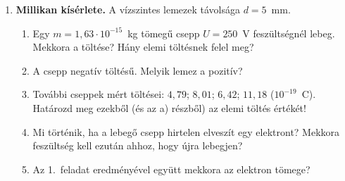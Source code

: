 \documentclass[12pt]{article}
\begin{document}
\vspace{4pt}
\begin{enumerate}[start=2]
\item \textbf{Millikan kísérlete.} A vízszintes lemezek távolsága $d = 5$~mm.
  \begin{enumerate}
    \item Egy $m = 1{,}63\cdot 10^{-15}$~kg tömegű csepp $U = 250$~V feszültségnél lebeg.
      Mekkora a töltése? Hány elemi töltésnek felel meg?
    \item A csepp negatív töltésű. Melyik lemez a pozitív?
    \item További cseppek mért töltései: $4{,}79$; $8{,}01$; $6{,}42$; $11{,}18$
      ($10^{-19}$~C). Határozd meg ezekből (és az a) részből) az elemi töltés értékét!
    \item Mi történik, ha a lebegő csepp hirtelen elveszít egy elektront? Mekkora
      feszültség kell ezután ahhoz, hogy újra lebegjen?
    \item Az 1.~feladat eredményével együtt mekkora az elektron tömege?
  \end{enumerate}
\end{enumerate}
\end{document}
